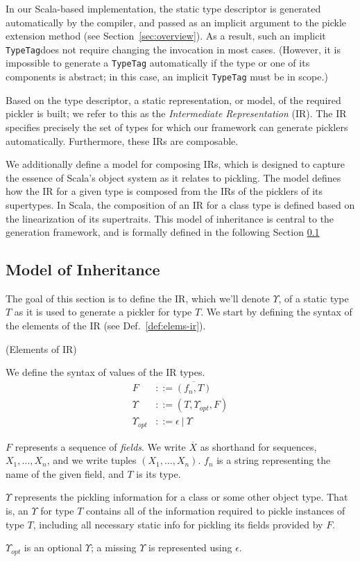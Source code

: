 \documentclass[10pt]{sigplanconf}
\theoremstyle{definition}
\theoremstyle{definition}
\newcommand{\term}[1]{\mbox{\texttt{#1}}}
\begin{document}
In our Scala-based implementation, the static type descriptor is generated
automatically by the compiler, and passed as an implicit argument to the
pickle extension method (see Section~\ref{sec:overview}). As a result, such an
implicit \term{TypeTag}\footnotemark[1] does not require changing the invocation in most cases.
(However, it is impossible to generate a \term{TypeTag} automatically if the
type or one of its components is abstract; in this case, an implicit
\term{TypeTag} must be in scope.)

Based on the type descriptor, a static representation, or model, of the
required pickler is built; we refer to this as the {\em Intermediate
Representation} (IR). The IR specifies precisely the set of types for which
our framework can generate picklers automatically. Furthermore, these IRs are composable.

We additionally define a model for composing IRs, which is designed to capture
the essence of Scala's object system as it relates to pickling. The model
defines how the IR for a given type is composed from the IRs of the picklers
of its supertypes. In Scala, the composition of an IR for a class type is
defined based on the linearization of its supertraits\footnotemark[2].
This model of inheritance is central to the generation framework, and is
formally defined in the following Section \ref{sec:ir}

\subsection{Model of Inheritance}
\label{sec:ir}

The goal of this section is to define the IR, which we'll denote
$\Upsilon$, of a static type $T$ as it is used to generate a pickler for
type $T$. We start by defining the syntax of the elements of the IR
(see Def.~\ref{def:elems-ir}).

\begin{defn}{(Elements of IR)}
\label{def:elems-ir}

We define the syntax of values of the IR types.
\vspace{-0.3em}
\begin{align*}
F&        ::= \overline{(f_n, T)}\\
\Upsilon&       ::= (T, \Upsilon_{opt}, F)\\
\Upsilon_{opt}& ::= \epsilon~|~\Upsilon
\end{align*}

$F$ represents a sequence of \textit{fields}. We write $\overline{X}$ as
shorthand for sequences, $X_1,\dots,X_n$, and we write tuples
$(X_1,\dots,X_n)$. $f_n$ is a string representing the name of the given field,
and $T$ is its type.

$\Upsilon$ represents the pickling information for a class or some other object
type. That is, an $\Upsilon$ for type $T$ contains all of the information required
to pickle instances of type $T$, including all necessary static info for
pickling its fields provided by $F$.

$\Upsilon_{opt}$ is an optional $\Upsilon$; a missing $\Upsilon$ is represented using $\epsilon$.
\end{defn}
\end{document}
